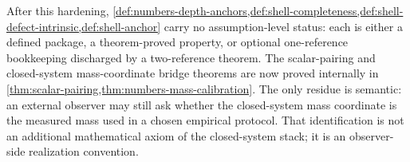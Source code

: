 \begin{remark}
After this hardening,
\cref{def:numbers-depth-anchors,def:shell-completeness,def:shell-defect-intrinsic,def:shell-anchor}
carry no assumption-level status: each is either a defined package,
a theorem-proved property, or optional one-reference bookkeeping discharged by
a two-reference theorem.  The scalar-pairing and closed-system mass-coordinate bridge theorems are now
proved internally in \cref{thm:scalar-pairing,thm:numbers-mass-calibration}.
The only residue is semantic: an external observer may still ask whether the
closed-system mass coordinate is the measured mass used in a chosen empirical
protocol.  That identification is not an additional mathematical axiom of the
closed-system stack; it is an observer-side realization convention.
\end{remark}